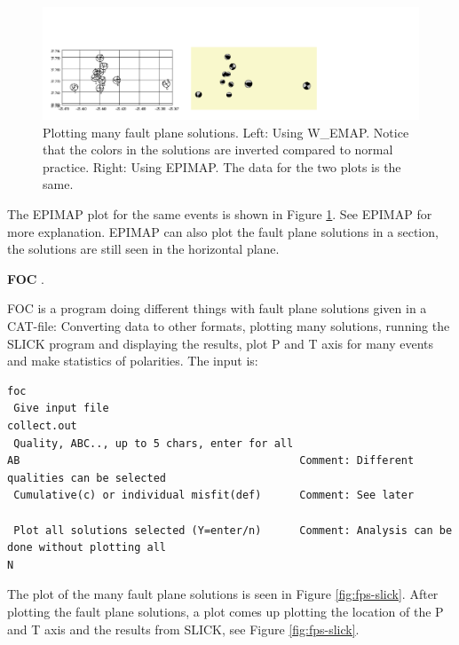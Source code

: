   

\begin{figure}
\centerline{\includegraphics[width=0.9\linewidth]{fig/fps-twomaps}}
\caption{Plotting many fault plane solutions. Left: Using W\_EMAP. Notice that the colors in the solutions are inverted compared to normal practice. Right: Using EPIMAP. The data for the two plots is the same.}
\label{fig:fps-twomaps}
\end{figure}


The EPIMAP plot for the same events is shown in Figure \ref{fig:fps-twomaps}. See EPIMAP for more explanation. EPIMAP can also plot the fault plane solutions in a section, the solutions are still seen in the horizontal plane.


\textbf{FOC}
\label{page:foc}.

FOC is a program doing different things with fault plane solutions given in a CAT-file: Converting data to other formats, plotting many solutions, running the SLICK program and displaying the results, plot P and T axis for many events and make statistics of polarities. The input is:

\begin{verbatim}
foc
 Give input file
collect.out
 Quality, ABC.., up to 5 chars, enter for all
AB                                            Comment: Different qualities can be selected
 Cumulative(c) or individual misfit(def)      Comment: See later

 Plot all solutions selected (Y=enter/n)      Comment: Analysis can be done without plotting all
N
\end{verbatim}

The plot of the many fault plane solutions is seen in Figure \ref{fig:fps-slick}. 
After plotting the fault plane solutions, a plot comes up plotting 
the location of the P and T axis and the results from SLICK, see Figure \ref{fig:fps-slick}.

